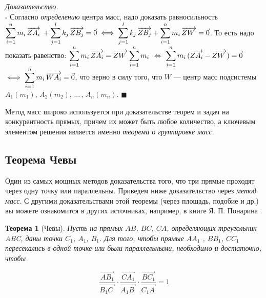 \documentclass[14pt]{extarticle}
\let\Overrightarrow\overrightarrow
\newtheorem*{theorem}{\normalfont\fontsize{15}{15}\textup{Теорема}}
\renewenvironment{proof}
    {\noindent \textit{Доказательство.}\\
	\indent $\square$}
	{ $\blacksquare$\\ }
\begin{document}
\begin{proof}
Согласно \textit{определению} центра масс, надо доказать равносильность\\
$\mathlarger{\sum_{i=1}^{n} m_i \, \Overrightarrow{ZA_i} \: + 
\sum_{j=1}^{l} k_j \, \Overrightarrow{ZB_j}} = \vec{0} \iff 
\mathlarger{\sum_{j=1}^{l} k_j \, \Overrightarrow{ZB_j} + 
	 \sum_{i=1}^{n} m_i \, \Overrightarrow{ZW_{\: \,}}} = \vec{0}$.
То есть надо показать равенство:
$\mathlarger{\sum_{i=1}^{n} m_i \, \Overrightarrow{ZA_i} = 
\Overrightarrow{ZW_{\: \,}} \sum_{i=1}^{n} m_i}$ $\iff$   
$\mathlarger{\sum_{i=1}^{n}
m_i \, (\Overrightarrow{ZA_i} - \Overrightarrow{ZW_{\: \,}})} = \vec{0}$ 
$\iff \mathlarger{\sum_{i=1}^{n}
m_i \, \Overrightarrow{WA_i}} = \vec{0}$, что верно в силу того, что $W$ ---
центр масс подсистемы $A_1(m_1), \, A_2(m_2), \, ... \, , \, A_n(m_n)$.
\end{proof}


Метод масс широко используется при доказательстве теорем и задач на
конкурентность прямых, причем их может быть любое количество, а ключевым 
элементом решения является именно \textit{теорема о группировке масс}. 


\subsection{Теорема Чевы} 

\indent Один из самых мощных методов доказательства того, что три прямые 
проходят через одну точку или параллельны. 
Приведем ниже доказательство через \textit{метод масс}.
С другими доказательствами этой теоремы (через площадь, подобие и др.) 
вы можете ознакомится в других источниках, например, в книге Я. П. Понарина
.


\begin{theorem}[Чевы]
	Пусть на прямых $AB$, $BC$, $CA$, определяющих
    треугольник ABC, даны точки $C_1$, $A_1$, $B_1$. Для того, чтобы прямые
    $AA_1$ , $BB_1$, $CC_1$ пересекались в одной точке или были параллельными,
    необходимо и достаточно, чтобы
	
	\begin{ceqn}
	\[
    \dfrac{\Overrightarrow{AB_1}}{\Overrightarrow{B_1C_{\, \,}}} \cdot 
	\dfrac{\Overrightarrow{CA_1}}
	{\Overrightarrow{A_1B_{\:}}} \cdot \dfrac{\Overrightarrow{BC_1}}
	{\Overrightarrow{C_1A_{\,}}} = 1
	\]
    \end{ceqn}

\end{theorem}
\end{document}
